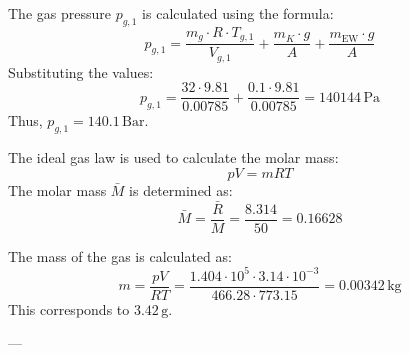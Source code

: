 The gas pressure \( p_{g,1} \) is calculated using the formula:  
\[
p_{g,1} = \frac{m_{g} \cdot R \cdot T_{g,1}}{V_{g,1}} + \frac{m_{K} \cdot g}{A} + \frac{m_{\text{EW}} \cdot g}{A}
\]  
Substituting the values:  
\[
p_{g,1} = \frac{32 \cdot 9.81}{0.00785} + \frac{0.1 \cdot 9.81}{0.00785} = 140144 \, \text{Pa}
\]  
Thus, \( p_{g,1} = 140.1 \, \text{Bar} \).  

The ideal gas law is used to calculate the molar mass:  
\[
pV = mRT
\]  
The molar mass \( \bar{M} \) is determined as:  
\[
\bar{M} = \frac{\bar{R}}{M} = \frac{8.314}{50} = 0.16628
\]  

The mass of the gas is calculated as:  
\[
m = \frac{pV}{RT} = \frac{1.404 \cdot 10^5 \cdot 3.14 \cdot 10^{-3}}{466.28 \cdot 773.15} = 0.00342 \, \text{kg}
\]  
This corresponds to \( 3.42 \, \text{g} \).  

---